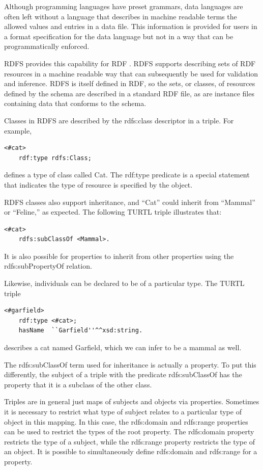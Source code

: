 Although programming languages have preset grammars, data languages are often
left without a language that describes in machine readable terms the allowed
values and entries in a data file. This information is provided for users in
a format specification for the data language but not in a way that can be
programmatically enforced. 

RDFS provides this capability for RDF \cite{noauthor_rdf_nodate-5}\cite{
allemang_semantic_2008}. RDFS supports describing sets of RDF resources in a
machine readable way that can subsequently be used for validation and inference.
RDFS is itself defined in RDF, so the sets, or classes, of resources defined by
the schema are described in a standard RDF file, as are instance files
containing data that conforms to the schema.

Classes in RDFS are described by the rdfs:class descriptor in a triple. For
example,
\begin{lstlisting}[language=TURTL]
<#cat>
    rdf:type rdfs:Class;
\end{lstlisting}
defines a type of class called Cat. The rdf:type predicate is a special
statement that indicates the type of resource is specified by the
object. 

RDFS classes also support inheritance, and ``Cat'' could inherit from
``Mammal'' or ``Feline,'' as expected. The following TURTL triple illustrates
that:
\begin{lstlisting}[language=TURTL]
<#cat>
    rdfs:subClassOf <Mammal>.
\end{lstlisting}
It is also possible for properties to inherit from other properties using the
rdfs:subPropertyOf relation.

Likewise, individuals can be declared to be of a particular type. The TURTL
triple
\begin{lstlisting}[language=TURTL]
<#garfield>
    rdf:type <#cat>;
    hasName  ``Garfield''^^xsd:string.
\end{lstlisting}
describes a cat named Garfield, which we can infer to be a mammal as well.

The rdfs:subClassOf term used for inheritance is actually a property. To put
this differently, the subject of a triple with the predicate rdfs:subClassOf
has the property that it is a subclass of the other class. 

Triples are in general just maps of subjects and objects via properties.
Sometimes it is necessary to restrict what type of subject relates to a
particular type of object in this mapping. In this case, the rdfs:domain and
rdfs:range properties can be used to restrict the types of the root property.
The rdfs:domain property restricts the type of a subject, while the rdfs:range
property restricts the type of an object. It is possible to simultaneously
define rdfs:domain and rdfs:range for a property.

